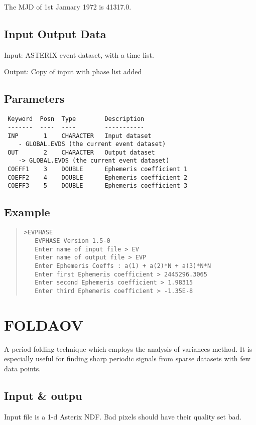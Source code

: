 \documentclass{book}
\renewcommand{\_}{{\tt\char'137}}     %
\begin{document}
The MJD of 1st January 1972 is 41317.0.

\subsection{Input Output Data}
Input: ASTERIX event dataset, with a time list.

Output: Copy of input with phase list added

\subsection{Parameters}
\begin{verbatim}
 Keyword  Posn  Type        Description
 -------  ----  ----        -----------
 INP       1    CHARACTER   Input dataset
    - GLOBAL.EVDS (the current event dataset)
 OUT       2    CHARACTER   Output dataset
    -> GLOBAL.EVDS (the current event dataset)
 COEFF1    3    DOUBLE      Ephemeris coefficient 1
 COEFF2    4    DOUBLE      Ephemeris coefficient 2
 COEFF3    5    DOUBLE      Ephemeris coefficient 3

\end{verbatim}\subsection{Example}
\begin{quote}\begin{verbatim}
>EVPHASE
   EVPHASE Version 1.5-0
   Enter name of input file > EV
   Enter name of output file > EVP
   Enter Ephemeris Coeffs : a(1) + a(2)*N + a(3)*N*N
   Enter first Ephemeris coefficient > 2445296.3065
   Enter second Ephemeris coefficient > 1.98315
   Enter third Ephemeris coefficient > -1.35E-8
\end{verbatim}\end{quote}
\section{FOLDAOV}
A period folding technique which employs the analysis of variances
method. It is especially useful for finding sharp periodic signals
from sparse datasets with few data points.

\subsection{Input \& outpu}
Input file is a 1-d Asterix NDF. Bad pixels should have their quality
set bad.
\end{document}
